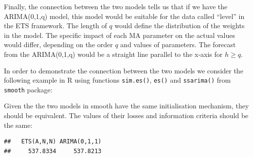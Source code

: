 \documentclass[]{book}
\newenvironment{Shaded}{\begin{snugshade}}{\end{snugshade}}
\newcommand{\CommentTok}[1]{\textcolor[rgb]{0.56,0.35,0.01}{\textit{#1}}}
\newcommand{\DataTypeTok}[1]{\textcolor[rgb]{0.13,0.29,0.53}{#1}}
\newcommand{\DecValTok}[1]{\textcolor[rgb]{0.00,0.00,0.81}{#1}}
\newcommand{\FloatTok}[1]{\textcolor[rgb]{0.00,0.00,0.81}{#1}}
\newcommand{\KeywordTok}[1]{\textcolor[rgb]{0.13,0.29,0.53}{\textbf{#1}}}
\newcommand{\NormalTok}[1]{#1}
\newcommand{\OperatorTok}[1]{\textcolor[rgb]{0.81,0.36,0.00}{\textbf{#1}}}
\newcommand{\StringTok}[1]{\textcolor[rgb]{0.31,0.60,0.02}{#1}}
\theoremstyle{definition}
\theoremstyle{definition}
\theoremstyle{definition}
\theoremstyle{definition}
\theoremstyle{remark}
\begin{document}
Finally, the connection between the two models tells us that if we have the ARIMA(0,1,q) model, this model would be suitable for the data called ``level'' in the ETS framework. The length of \(q\) would define the distribution of the weights in the model. The specific impact of each MA parameter on the actual values would differ, depending on the order \(q\) and values of parameters. The forecast from the ARIMA(0,1,q) would be a straight line parallel to the x-axis for \(h\geq q\).

In order to demonstrate the connection between the two models we consider the following example in R using functions \texttt{sim.es()}, \texttt{es()} and \texttt{ssarima()} from \texttt{smooth} package:

\begin{Shaded}
\end{Shaded}

Given the the two models in smooth have the same initialisation mechanism, they should be equivalent. The values of their losses and information criteria should be the same:

\begin{Shaded}
\end{Shaded}

\begin{verbatim}
##   ETS(A,N,N) ARIMA(0,1,1) 
##     537.8334     537.8213
\end{verbatim}
\end{document}
